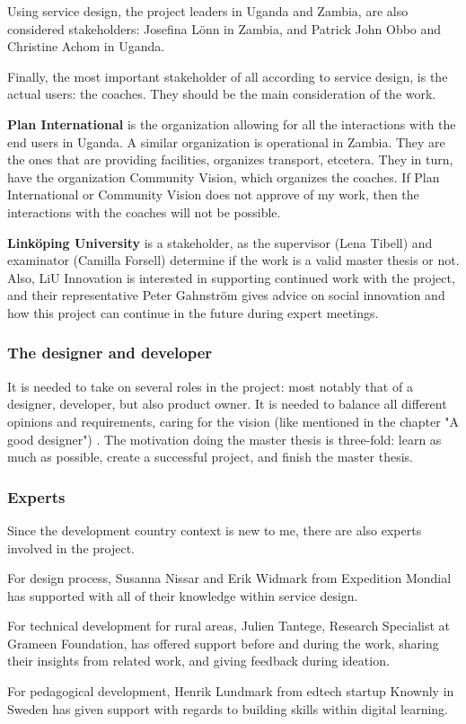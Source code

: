 Using service design, the project leaders in Uganda and Zambia, are also considered stakeholders: Josefina Lönn in Zambia, and Patrick John Obbo and Christine Achom in Uganda.

Finally, the most important stakeholder of all according to service design, is the actual users: the coaches. They should be the main consideration of the work.

\textbf{Plan International} is the organization allowing for all the interactions with the end users in Uganda. A similar organization is operational in Zambia. They are the ones that are providing facilities, organizes transport, etcetera. They in turn, have the organization Community Vision, which organizes the coaches. If Plan International or Community Vision does not approve of my work, then the interactions with the coaches will not be possible.

\textbf{Linköping University} is a stakeholder, as the supervisor (Lena Tibell) and examinator (Camilla Forsell) determine if the work is a valid master thesis or not. Also, LiU Innovation is interested in supporting continued work with the project, and their representative Peter Gahnström gives advice on social innovation and how this project can continue in the future during expert meetings.

\subsubsection{The designer and developer}
It is needed to take on several roles in the project: most notably that of a designer, developer, but also product owner. It is needed to balance all different opinions and requirements, caring for the vision (like mentioned in the chapter "A good designer") . The motivation doing the master thesis is three-fold: learn as much as possible, create a successful project, and finish the master thesis.

\subsubsection{Experts}
Since the development country context is new to me, there are also experts involved in the project.

For design process, Susanna Nissar and Erik Widmark from Expedition Mondial has supported with all of their knowledge within service design.

For technical development for rural areas, Julien Tantege, Research Specialist at Grameen Foundation, has offered support before and during the work, sharing their insights from related work, and giving feedback during ideation.

For pedagogical development, Henrik Lundmark from edtech startup Knownly in Sweden has given support with regards to building skills within digital learning.
